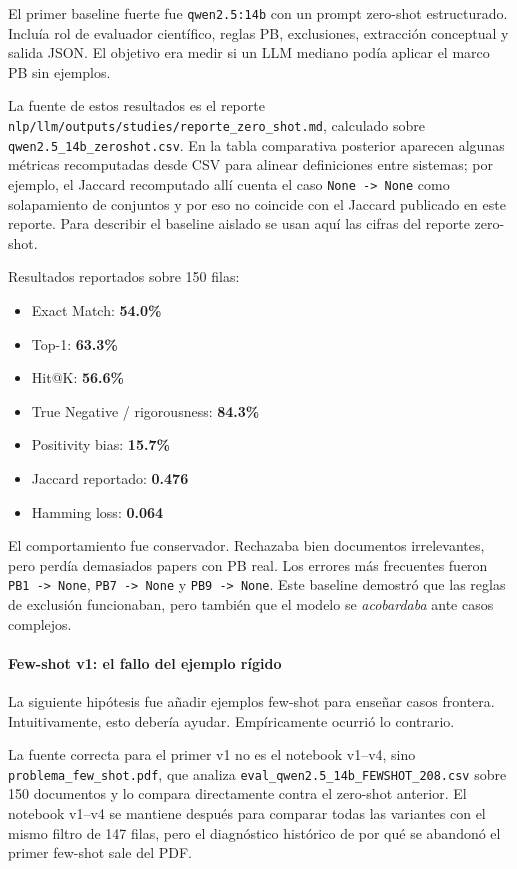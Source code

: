 El primer baseline fuerte fue \texttt{qwen2.5:14b} con un prompt zero-shot estructurado. Incluía rol de evaluador científico, reglas PB, exclusiones, extracción conceptual y salida JSON. El objetivo era medir si un LLM mediano podía aplicar el marco PB sin ejemplos.

La fuente de estos resultados es el reporte \texttt{nlp/llm/outputs/studies/reporte\_zero\_shot.md}, calculado sobre \texttt{qwen2.5\_14b\_zeroshot.csv}. En la tabla comparativa posterior aparecen algunas métricas recomputadas desde CSV para alinear definiciones entre sistemas; por ejemplo, el Jaccard recomputado allí cuenta el caso \texttt{None -> None} como solapamiento de conjuntos y por eso no coincide con el Jaccard publicado en este reporte. Para describir el baseline aislado se usan aquí las cifras del reporte zero-shot.

Resultados reportados sobre 150 filas:

\begin{itemize}
\item Exact Match: \textbf{54.0\%}
\item Top-1: \textbf{63.3\%}
\item Hit@K: \textbf{56.6\%}
\item True Negative / rigorousness: \textbf{84.3\%}
\item Positivity bias: \textbf{15.7\%}
\item Jaccard reportado: \textbf{0.476}
\item Hamming loss: \textbf{0.064}
\end{itemize}

El comportamiento fue conservador. Rechazaba bien documentos irrelevantes, pero perdía demasiados papers con PB real. Los errores más frecuentes fueron \texttt{PB1 -> None}, \texttt{PB7 -> None} y \texttt{PB9 -> None}. Este baseline demostró que las reglas de exclusión funcionaban, pero también que el modelo se \emph{acobardaba} ante casos complejos.

\paragraph*{Few-shot v1: el fallo del ejemplo rígido}

La siguiente hipótesis fue añadir ejemplos few-shot para enseñar casos frontera. Intuitivamente, esto debería ayudar. Empíricamente ocurrió lo contrario.

La fuente correcta para el primer v1 no es el notebook v1--v4, sino \texttt{problema\_few\_shot.pdf}, que analiza \texttt{eval\_qwen2.5\_14b\_FEWSHOT\_208.csv} sobre 150 documentos y lo compara directamente contra el zero-shot anterior. El notebook v1--v4 se mantiene después para comparar todas las variantes con el mismo filtro de 147 filas, pero el diagnóstico histórico de por qué se abandonó el primer few-shot sale del PDF.

